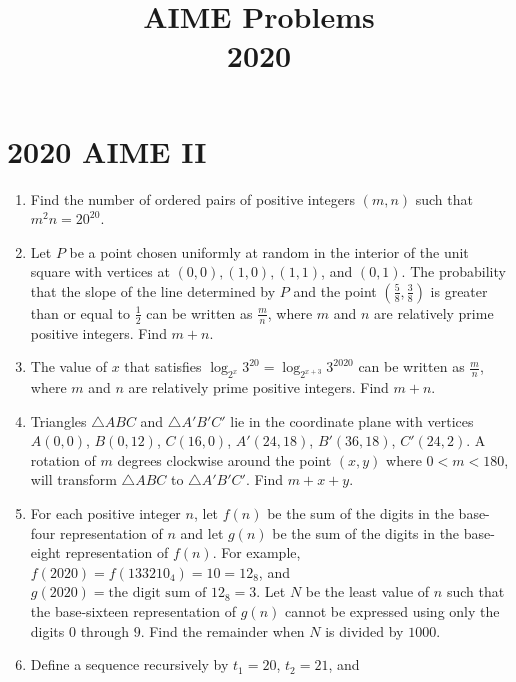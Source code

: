 \documentclass{article}
\title{AIME Problems \\ 2020}
\date{}
\begin{document}
\maketitle\thispagestyle{fancy}\newpage\section*{2020 AIME II}
\begin{enumerate}[label=\arabic*., itemsep=0.5em]
\item Find the number of ordered pairs of positive integers \((m,n)\) such that \({m^2n = 20 ^{20}}\).\par \vspace{0.5em}\item Let \(P\) be a point chosen uniformly at random in the interior of the unit square with vertices at \((0,0), (1,0), (1,1)\), and \((0,1)\). The probability that the slope of the line determined by \(P\) and the point \(\left(\frac58, \frac38 \right)\) is greater than or equal to \(\frac12\) can be written as \(\frac{m}{n}\), where \(m\) and \(n\) are relatively prime positive integers. Find \(m+n\).\par \vspace{0.5em}\item The value of \(x\) that satisfies \(\log_{2^x} 3^{20} = \log_{2^{x+3}} 3^{2020}\) can be written as \(\frac{m}{n}\), where \(m\) and \(n\) are relatively prime positive integers. Find \(m+n\).\par \vspace{0.5em}\item Triangles \(\triangle ABC\) and \(\triangle A'B'C'\) lie in the coordinate plane with vertices \(A(0,0)\), \(B(0,12)\), \(C(16,0)\), \(A'(24,18)\), \(B'(36,18)\), \(C'(24,2)\). A rotation of \(m\) degrees clockwise around the point \((x,y)\) where \(0<m<180\), will transform \(\triangle ABC\) to \(\triangle A'B'C'\). Find \(m+x+y\).\par \vspace{0.5em}\item For each positive integer \(n\), let \(f(n)\) be the sum of the digits in the base-four representation of \(n\) and let \(g(n)\) be the sum of the digits in the base-eight representation of \(f(n)\). For example, \(f(2020) = f(133210_{\text{4}}) = 10 = 12_{\text{8}}\), and \(g(2020) = \text{the digit sum of }12_{\text{8}} = 3\). Let \(N\) be the least value of \(n\) such that the base-sixteen representation of \(g(n)\) cannot be expressed using only the digits \(0\) through \(9\). Find the remainder when \(N\) is divided by \(1000\).\par \vspace{0.5em}\item Define a sequence recursively by \(t_1 = 20\), \(t_2 = 21\), and

\end{enumerate}
\end{document}
